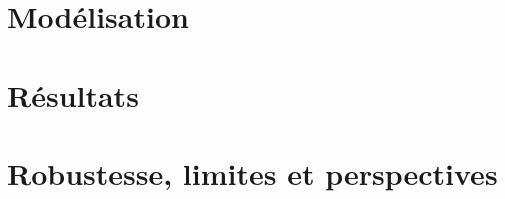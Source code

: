 \documentclass[12pt,a4paper]{report}
\begin{document}
\part{Modélisation}
\label{part:modele}

\part{Résultats}
\label{part:resultats}

\part{Robustesse, limites et perspectives}
\label{part:limites}


\appendix
\end{document}

